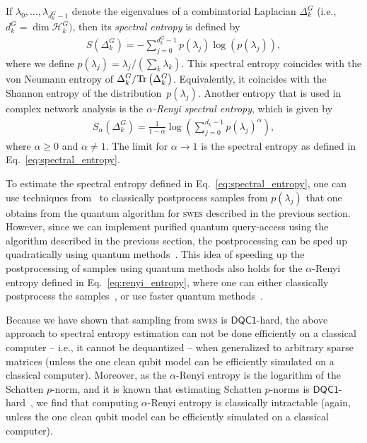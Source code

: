 \documentclass[a4paper, onecolumn, accepted=2022-08-28]{quantumarticle}
\newcommand{\Tr}{\mbox{\rm Tr}}
\newcommand{\tr}[1]{\Tr\left(#1\right)}
\begin{document}
If $\lambda_0, \dots, \lambda_{d_k^G-1}$ denote the eigenvalues of a combinatorial Laplacian $\Delta_k^G$ (i.e., $d^G_k = \dim \mathcal{H}_k^G)$, then its \emph{spectral entropy} is defined by
\begin{align}
  \label{eq:spectral_entropy}
  S(\Delta_k^G) = -\sum_{j = 0}^{d^G_k-1}p(\lambda_j)\log(p(\lambda_j)),
\end{align}
where we define $p(\lambda_j) = \lambda_j / \left(\sum_k\lambda_k\right)$.
This spectral entropy coincides with the von Neumann entropy of $\Delta_k^G/ \tr{\Delta_k^G}$.
Equivalently, it coincides with the Shannon entropy of the distribution~$p(\lambda_j)$.
Another entropy that is used in complex network analysis is the \emph{$\alpha$-Renyi spectral entropy}, which is given by
\begin{align}
  \label{eq:renyi_entropy}
  S_\alpha(\Delta_k^G) = \frac{1}{1 - \alpha}\log\left(\sum_{j = 0}^{d_k-1}p(\lambda_j)^\alpha\right),
\end{align}
where $\alpha \geq 0$ and $\alpha \neq 1$.
The limit for $\alpha \rightarrow 1$ is the spectral entropy as defined in Eq.~\eqref{eq:spectral_entropy}.

To estimate the spectral entropy defined in Eq.~\eqref{eq:spectral_entropy}, one can use techniques from~\cite{acharya:entropy, valiant:entropy} to classically postprocess samples from $p(\lambda_j)$ that one obtains from the quantum algorithm for \textsc{swes} described in the previous section.
However, since we can implement purified quantum query-access using the algorithm described in the previous section, the postprocessing can be sped up quadratically using quantum methods~\cite{gilyen:entropy}.
This idea of speeding up the postprocessing of samples using quantum methods also holds for the $\alpha$-Renyi entropy defined in Eq.~\eqref{eq:renyi_entropy}, where one can either classically postprocess the samples~\cite{acharya:renyi_entropy}, or use faster quantum methods~\cite{subramanian:entropy}.

Because we have shown that sampling from \textsc{swes} is $\mathsf{DQC1}$-hard, the above approach to spectral entropy estimation can not be done efficiently on a classical computer -- i.e., it cannot be dequantized -- when generalized to arbitrary sparse matrices (unless the one clean qubit model can be efficiently simulated on a classical computer).
Moreover, as the $\alpha$-Renyi entropy is the logarithm of the Schatten $p$-norm, and it is known that estimating Schatten $p$-norms is $\mathsf{DQC1}$-hard~\cite{cade:schatten_p}, we find that computing $\alpha$-Renyi entropy is classically intractable (again, unless the one clean qubit model can be efficiently simulated on a classical computer). 
\end{document}
